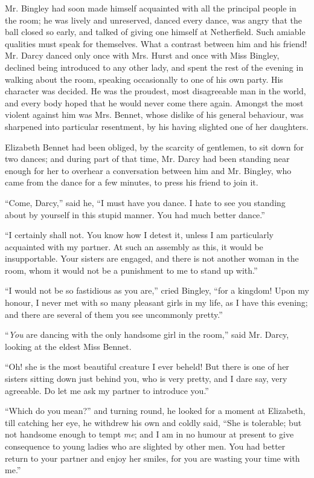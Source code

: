 Mr. Bingley had soon made himself acquainted with
all the principal people in the room; he was lively and
unreserved, danced every dance, was angry that the ball
closed so early, and talked of giving one himself at
Netherfield. Such amiable qualities must speak for themselves.
What a contrast between him and his friend! Mr. Darcy
danced only once with Mrs. Hurst and once with Miss
Bingley, declined being introduced to any other lady, and
spent the rest of the evening in walking about the room,
speaking occasionally to one of his own party. His character
was decided. He was the proudest, most disagreeable
man in the world, and every body hoped that he would
never come there again. Amongst the most violent
against him was Mrs. Bennet, whose dislike of his general
behaviour, was sharpened into particular resentment, by
his having slighted one of her daughters.

Elizabeth Bennet had been obliged, by the scarcity of
gentlemen, to sit down for two dances; and during part
of that time, Mr. Darcy had been standing near enough
for her to overhear a conversation between him and
Mr. Bingley, who came from the dance for a few minutes,
to press his friend to join it.

“Come, Darcy,” said he, “I must have you dance.
I hate to see you standing about by yourself in this stupid
manner. You had much better dance.”

“I certainly shall not. You know how I detest it,
unless I am particularly acquainted with my partner. At
such an assembly as this, it would be insupportable.
Your sisters are engaged, and there is not another woman
in the room, whom it would not be a punishment to me
to stand up with.”

“I would not be so fastidious as you are,” cried Bingley,
“for a kingdom! Upon my honour, I never met with
so many pleasant girls in my life, as I have this evening;
and there are several of them you see uncommonly pretty.”

“\textit{You} are dancing with the only handsome girl in the
room,” said Mr. Darcy, looking at the eldest Miss Bennet.

“Oh! she is the most beautiful creature I ever beheld!
But there is one of her sisters sitting down just behind
you, who is very pretty, and I dare say, very agreeable.
Do let me ask my partner to introduce you.”

“Which do you mean?” and turning round, he looked
for a moment at Elizabeth, till catching her eye, he withdrew
his own and coldly said, “She is tolerable; but not
handsome enough to tempt \textit{me}; and I am in no humour
at present to give consequence to young ladies who are
slighted by other men. You had better return to your
partner and enjoy her smiles, for you are wasting your
time with me.”


